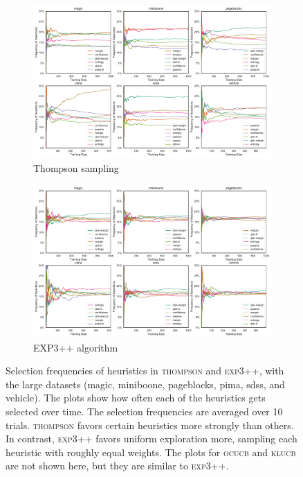 \documentclass[fleqn,10pt,lineno]{wlpeerj} %
\begin{document}
\begin{figure}[tbp]
	\centering
	\begin{subfigure}[t]{\textwidth}
        \centering
        \includegraphics[width=\textwidth]{figures/selection-thompson-large}
		\caption{Thompson sampling}
		\label{fig:selection-thompson-large}
	\end{subfigure}
	\begin{subfigure}[t]{\textwidth}
        \centering
        \includegraphics[width=\textwidth]{figures/selection-exp++-large}
		\caption{EXP3++ algorithm}
		\label{fig:selection-exp-large}
    \end{subfigure}
	\caption[Heuristic selection frequencies]{Selection frequencies of
	heuristics in \textsc{thompson} and \textsc{exp3++}, with the large
	datasets (magic, miniboone, pageblocks, pima, sdss, and vehicle). The plots
	show how often each of the heuristics gets selected over time. The
	selection frequencies are averaged over 10 trials. \textsc{thompson} favors
	certain heuristics more strongly than others. In contrast, \textsc{exp3++}
	favors uniform exploration more, sampling each heuristic with roughly equal
	weights. The plots for \textsc{ocucb} and \textsc{klucb} are not shown
	here, but they are similar to \textsc{exp3++}.}
	\label{fig:selection}
\end{figure}
\end{document}

